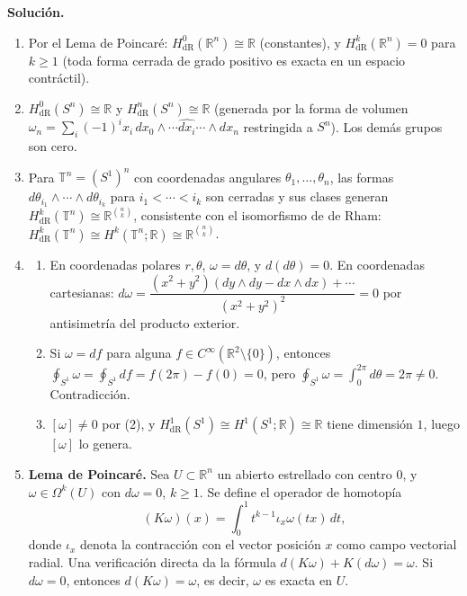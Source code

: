 \documentclass[11pt,a4paper]{article}
\theoremstyle{plain}
\theoremstyle{definition}
\theoremstyle{remark}
\newcommand{\RR}{\mathbb R}
\begin{document}
\begin{enumerate}[label=\arabic*.,leftmargin=*]
\noindent\textbf{Solución.}
\begin{enumerate}[label=\alph*)]
\item Por el Lema de Poincaré: $H^0_{\mathrm{dR}}(\RR^n)\cong\RR$
(constantes), y $H^k_{\mathrm{dR}}(\RR^n)=0$ para $k\ge1$ (toda forma
cerrada de grado positivo es exacta en un espacio contráctil).
\item $H^0_{\mathrm{dR}}(S^n)\cong\RR$ y $H^n_{\mathrm{dR}}(S^n)\cong\RR$
(generada por la forma de volumen
$\omega_n=\sum_i(-1)^ix_i\,dx_0\wedge\cdots\widehat{dx_i}\cdots\wedge dx_n$
restringida a $S^n$). Los demás grupos son cero.
\item Para $\mathbb T^n=(S^1)^n$ con coordenadas angulares
$\theta_1,\dots,\theta_n$, las formas $d\theta_{i_1}\wedge\cdots\wedge d\theta_{i_k}$
para $i_1<\cdots<i_k$ son cerradas y sus clases generan
$H^k_{\mathrm{dR}}(\mathbb T^n)\cong\RR^{\binom nk}$, consistente con el
isomorfismo de de Rham: $H^k_{\mathrm{dR}}(\mathbb T^n)\cong H^k(\mathbb T^n;\RR)\cong\RR^{\binom nk}$.
\item
\begin{enumerate}[label=\arabic*)]
\item En coordenadas polares $r,\theta$, $\omega=d\theta$, y $d(d\theta)=0$.
En coordenadas cartesianas:
$d\omega=\dfrac{(x^2+y^2)(dy\wedge dy-dx\wedge dx)+\cdots}{(x^2+y^2)^2}=0$
por antisimetría del producto exterior.
\item Si $\omega=df$ para alguna $f\in C^\infty(\RR^2\setminus\{0\})$,
entonces $\oint_{S^1}\omega=\oint_{S^1}df=f(2\pi)-f(0)=0$, pero
$\oint_{S^1}\omega=\int_0^{2\pi}d\theta=2\pi\ne0$. Contradicción.
\item $[\omega]\ne0$ por (2), y $H^1_{\mathrm{dR}}(S^1)\cong H^1(S^1;\RR)\cong\RR$
tiene dimensión $1$, luego $[\omega]$ lo genera.
\end{enumerate}
\item \textbf{Lema de Poincaré.} Sea $U\subset\RR^n$ un abierto
estrellado con centro $0$, y $\omega\in\Omega^k(U)$ con $d\omega=0$,
$k\ge1$. Se define el operador de homotopía
\[
(K\omega)(x)=\int_0^1t^{k-1}\iota_x\omega(tx)\,dt,
\]
donde $\iota_x$ denota la contracción con el vector posición $x$ como
campo vectorial radial. Una verificación directa da la fórmula
$d(K\omega)+K(d\omega)=\omega$. Si $d\omega=0$, entonces $d(K\omega)=\omega$,
es decir, $\omega$ es exacta en $U$.
\end{enumerate}


\end{enumerate}
\end{document}
